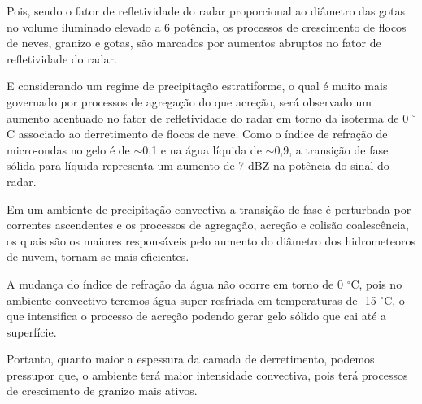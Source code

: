 Pois, sendo o fator de refletividade do radar proporcional ao diâmetro das gotas no volume iluminado elevado a 6 potência, os processos de crescimento de flocos de neves, granizo e gotas, são marcados por aumentos abruptos no fator de refletividade do radar. 

E considerando um regime de precipitação estratiforme, o qual é muito mais governado por processos de agregação do que acreção, será observado um aumento acentuado no fator de refletividade do radar em torno da isoterma de 0 $^{\circ}$C associado ao derretimento de flocos de neve.  Como o índice de refração de micro-ondas no gelo é de $\sim$0,1 e na água líquida de $\sim$0,9, a transição de fase sólida para líquida representa um aumento de 7 dBZ na potência do sinal do radar.




Em um ambiente de precipitação convectiva a transição de fase é perturbada por correntes ascendentes e os processos de agregação, acreção e colisão coalescência, os quais são os maiores responsáveis pelo aumento do diâmetro dos hidrometeoros de nuvem, tornam-se mais eficientes. 

A mudança do índice de refração da água não ocorre em torno de 0 $^{\circ}$C, pois no ambiente convectivo teremos água super-resfriada em temperaturas de -15 $^{\circ}$C, o que intensifica o processo de acreção podendo gerar gelo sólido que cai até a superfície.

Portanto, quanto maior a espessura da camada de derretimento, podemos pressupor que, o ambiente terá maior intensidade convectiva, pois terá processos de crescimento de granizo mais ativos.


